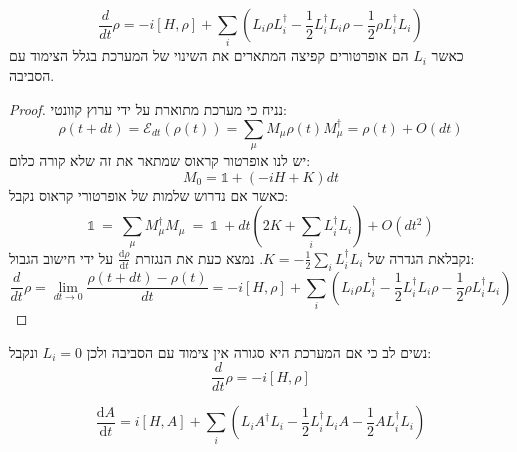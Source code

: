 \documentclass{tstextbook}
\begin{document}
\begin{theorem}
$$\frac{d}{d t}\rho=-i\left[H,\rho\right]+\sum_{i}\left({ L}_{i}\rho{ L}_{i}^{\dagger}-\frac{1}{2}{ L}_{i}^{\dagger}{ L}_{i}\rho-\frac{1}{2}\rho{ L}_{i}^{\dagger}{ L}_{i}\right)$$
כאשר \(L_{i}\) הם אופרטורים קפיצה המתארים את השינוי של המערכת בגלל הצימוד עם הסביבה.

\end{theorem}
\begin{proof}
נניח כי מערכת מתוארת על ידי ערוץ קוונטי:
$$\rho\left(t+d t\right)=\mathcal{E}_ {d t}\left(\rho\left(t\right)\right)=\sum_{\mu}M_{\mu}\rho\left(t\right)M_{\mu}^{\dagger}=\rho\left(t\right)+O\left(d t\right)$$
יש לנו אופרטור קראוס שמתאר את זה שלא קורה כלום:
$$M_{0}=\mathbb{1}+\left(-i H+K\right)d t$$
כאשר אם נדרוש שלמות של אופרטורי קראוס נקבל:
$$\mathbb{1}\ =\ \sum_{\mu}M_{\mu}^{\dagger}M_{\mu}\ =\ \mathbb{1}\ +d t\left(2K+\sum_{i}L_{i}^{\dagger}L_{i}\right)+O\left(d t^{2}\right)$$
נקבלאת  הגדרה של \(K=-\frac{1}{2}\sum_{i}L_{i}^{\dagger}L_{i}\).  נמצא כעת את הנגזרת \(\frac{\mathrm{d} \rho}{\mathrm{d} t}\) על ידי חישוב הגבול:
$${\frac{d}{d t}}\rho=\operatorname*{lim}_{d t\longrightarrow0}{\frac{\rho\left(t+d t\right)-\rho\left(t\right)}{d t}}=-i\left[H,\rho\right]+\sum_{i}\left(L_{i}\rho L_{i}^{\dagger}-{\frac{1}{2}}L_{i}^{\dagger}L_{i}\rho-{\frac{1}{2}}\rho L_{i}^{\dagger}L_{i}\right)$$

\end{proof}
\begin{remark}
נשים לב כי אם המערכת היא סגורה אין צימוד עם הסביבה ולכן \(L_{i}=0\) ונקבל:
$$\frac{d}{d t}\rho=-i\left[H,\rho\right]$$

\end{remark}
\begin{proposition}
$$\frac{\mathrm{d} A}{\mathrm{d} t} =i[H,A]+\sum_{i}\left( L_{i}A^{\dagger}L_{i}-\frac{1}{2}L_{i}^{\dagger} L_{i}A-\frac{1}{2}AL_{i}^{\dagger}L_{i} \right)$$

\end{proposition}
\end{document}
